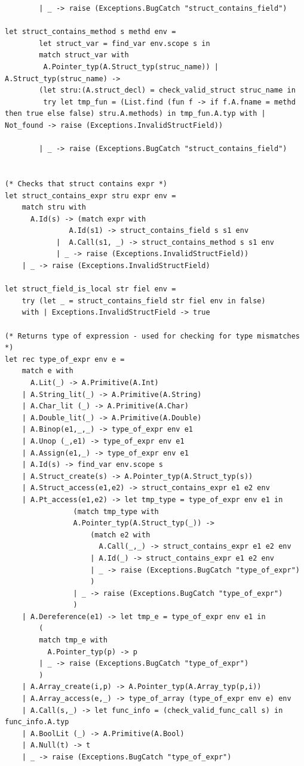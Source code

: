 \documentclass{article}
\begin{document}
\begin{lstlisting}
		| _ -> raise (Exceptions.BugCatch "struct_contains_field")

let struct_contains_method s methd env =
		let struct_var = find_var env.scope s in 
		match struct_var with 
		 A.Pointer_typ(A.Struct_typ(struc_name)) | A.Struct_typ(struc_name) ->
		(let stru:(A.struct_decl) = check_valid_struct struc_name in 
		 try let tmp_fun = (List.find (fun f -> if f.A.fname = methd then true else false) stru.A.methods) in tmp_fun.A.typ with | Not_found -> raise (Exceptions.InvalidStructField))

		| _ -> raise (Exceptions.BugCatch "struct_contains_field")


(* Checks that struct contains expr *)
let struct_contains_expr stru expr env = 
	match stru with
	  A.Id(s) -> (match expr with 
			   A.Id(s1) -> struct_contains_field s s1 env 
			|  A.Call(s1, _) -> struct_contains_method s s1 env
			| _ -> raise (Exceptions.InvalidStructField)) 
	| _ -> raise (Exceptions.InvalidStructField)

let struct_field_is_local str fiel env =
	try (let _ = struct_contains_field str fiel env in false) 
	with | Exceptions.InvalidStructField -> true

(* Returns type of expression - used for checking for type mismatches *)
let rec type_of_expr env e =
	match e with
	  A.Lit(_) -> A.Primitive(A.Int)
	| A.String_lit(_) -> A.Primitive(A.String)
  	| A.Char_lit (_) -> A.Primitive(A.Char)
  	| A.Double_lit(_) -> A.Primitive(A.Double)
  	| A.Binop(e1,_,_) -> type_of_expr env e1
  	| A.Unop (_,e1) -> type_of_expr env e1
  	| A.Assign(e1,_) -> type_of_expr env e1
  	| A.Id(s) -> find_var env.scope s
	| A.Struct_create(s) -> A.Pointer_typ(A.Struct_typ(s))
	| A.Struct_access(e1,e2) -> struct_contains_expr e1 e2 env
	| A.Pt_access(e1,e2) -> let tmp_type = type_of_expr env e1 in 
				(match tmp_type with
				A.Pointer_typ(A.Struct_typ(_)) -> 
					(match e2 with 
				  	  A.Call(_,_) -> struct_contains_expr e1 e2 env
				  	| A.Id(_) -> struct_contains_expr e1 e2 env
					| _ -> raise (Exceptions.BugCatch "type_of_expr")
					)
				| _ -> raise (Exceptions.BugCatch "type_of_expr")
				)
	| A.Dereference(e1) -> let tmp_e = type_of_expr env e1 in 
		(
		match tmp_e with
		  A.Pointer_typ(p) -> p
		| _ -> raise (Exceptions.BugCatch "type_of_expr")
		)
	| A.Array_create(i,p) -> A.Pointer_typ(A.Array_typ(p,i))
	| A.Array_access(e,_) -> type_of_array (type_of_expr env e) env
	| A.Call(s,_) -> let func_info = (check_valid_func_call s) in func_info.A.typ
  	| A.BoolLit (_) -> A.Primitive(A.Bool)
  	| A.Null(t) -> t
	| _ -> raise (Exceptions.BugCatch "type_of_expr")
	

\end{lstlisting}
\end{document}
